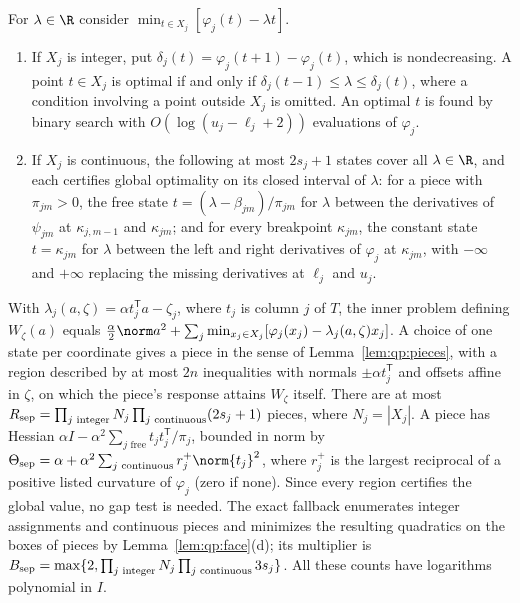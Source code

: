 \begin{lemma}\label{lem:qp:scalar}
For $\lambda\in\R$ consider $\min_{t\in X_j}[\varphi_j(t)-\lambda t]$.
\begin{enumerate}[label=(\alph*)]
\item If $X_j$ is integer, put $\delta_j(t)=\varphi_j(t+1)-\varphi_j(t)$, which
 is nondecreasing. A point $t\in X_j$ is optimal if and only if
 $\delta_j(t-1)\le\lambda\le\delta_j(t)$, where a condition involving a point
 outside $X_j$ is omitted. An optimal $t$ is found by binary search with
 $O(\log(u_j-\ell_j+2))$ evaluations of $\varphi_j$.
\item If $X_j$ is continuous, the following at most $2s_j+1$ states cover all
 $\lambda\in\R$, and each certifies global optimality on its closed interval
 of $\lambda$: for a piece with $\pi_{jm}>0$, the free state
 $t=(\lambda-\beta_{jm})/\pi_{jm}$ for $\lambda$ between the derivatives of
 $\psi_{jm}$ at $\kappa_{j,m-1}$ and $\kappa_{jm}$; and for every breakpoint
 $\kappa_{jm}$, the constant state $t=\kappa_{jm}$ for $\lambda$ between the
 left and right derivatives of $\varphi_j$ at $\kappa_{jm}$, with $-\infty$
 and $+\infty$ replacing the missing derivatives at $\ell_j$ and $u_j$.
\end{enumerate}
\end{lemma}

With $\lambda_j(a,\zeta)=\alpha t_j^{\mathsf T} a-\zeta_j$, where $t_j$ is column $j$
of $T$, the inner problem defining $W_\zeta(a)$ equals
$\frac\alpha2\norm a^2+\sum_j\min_{x_j\in X_j}[\varphi_j(x_j)-\lambda_j(a,\zeta)x_j]$.
A choice of one state per coordinate gives a piece in the sense of
Lemma~\ref{lem:qp:pieces}, with a region described by at most $2n$
inequalities with normals $\pm\alpha t_j^{\mathsf T}$ and offsets affine in $\zeta$,
on which the piece's response attains $W_\zeta$ itself. There are at most
$R_{\rm sep}=\prod_{j\text{ integer}}N_j\prod_{j\text{ continuous}}(2s_j+1)$
pieces, where $N_j=|X_j|$. A piece has Hessian
$\alpha I-\alpha^2\sum_{j\text{ free}}t_jt_j^{\mathsf T}/\pi_j$, bounded in norm by
$\Theta_{\rm sep}=\alpha+\alpha^2\sum_{j\text{ continuous}}r_j^+\norm{t_j}^2$,
where $r_j^+$ is the largest reciprocal of a positive listed curvature of
$\varphi_j$ (zero if none). Since every region certifies the global value, no
gap test is needed. The exact fallback enumerates integer assignments and
continuous pieces and minimizes the resulting quadratics on the boxes of
pieces by Lemma~\ref{lem:qp:face}(d); its multiplier is
$B_{\rm sep}=\max\{2,\prod_{j\text{ integer}}N_j\prod_{j\text{ continuous}}3s_j\}$.
All these counts have logarithms polynomial in $I$.

